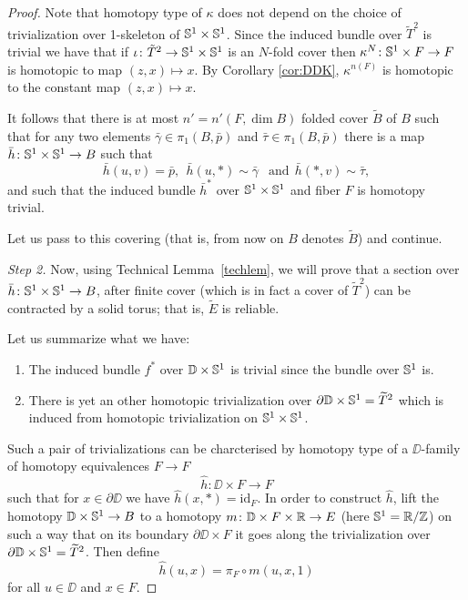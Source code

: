 \documentclass{amsart}
\begin{document}
\begin{proof}
Note that homotopy type of $\kappa$ does not depend on the choice of 
trivialization over 1-skeleton of ${\Bbb S}^1\times {\Bbb S}^1$.
Since the induced bundle over $\tilde T^2$ is trivial we have that 
if $ \iota\colon  \tilde T^2\to {\Bbb S}^1\times {\Bbb S}^1$ is an $N$-fold cover then 
$\kappa^N\colon {\Bbb S}^1\times F\to F$ is homotopic to map $(z,x)\mapsto x$.
By Corollary \ref{cor:DDK},  $\kappa^{n(F)}$ 
is homotopic to the constant map $(z,x)\mapsto x$.

It follows that there is  at most $n'=n'(F,\dim B)$ folded  cover $\widetilde B$ of $B$ such that for any two elements $\bar\gamma\in \pi_1(B,\bar p)$ and $\bar\tau\in \pi_1(B,\bar p)$ there is a map 
$\bar h\colon {\Bbb S}^1\times {\Bbb S}^1\to B$ such that 
$$\bar h(u,v)=\bar p,\ \ 
\bar h(u,*)\sim\bar\gamma\ \ \text{ and}\ \ 
\bar h(*,v)\sim\bar\tau,$$
and such that the induced bundle $\bar h^*$ over ${\Bbb S}^1\times {\Bbb S}^1$ and fiber $F$ is homotopy trivial.

\medskip

Let us pass to this covering (that is, from now on $B$ denotes $\widetilde B$) and continue.

\medskip

\noindent\textit{Step 2.} 
Now, using Technical Lemma~\ref{techlem}, 
we will prove that a section over 
$\bar h\colon {\Bbb S}^1\times {\Bbb S}^1\to B$, after finite cover (which is in fact a cover of $\tilde T^2$) can be contracted by a solid torus;
that is, $\widetilde E$ is reliable. 

Let us summarize what we have:

\begin{enumerate}
\item The  induced bundle $f^*$ over $\mathbb{D}\times {\Bbb S}^1$ is trivial since the bundle over ${\Bbb S}^1$ is. 
\item There is yet an other homotopic trivialization over $\partial \mathbb{D}\times {\Bbb S}^1=\widetilde T^2$ which is induced from homotopic trivialization on ${\Bbb S}^1\times {\Bbb S}^1$.
\end{enumerate}



Such a pair of trivializations can be charcterised by homotopy type of a
$\DD$-family of homotopy equivalences $F\to F$
\[\hat h\colon \DD\times F\to F\]
such that for 
$x\in\partial \DD$ we have $\hat h(x,*)=\mathrm{id}_F$.
In order to construct $\hat h$, 
lift the homotopy $\mathbb{D}\times {\Bbb S}^1\to B$ to a homotopy 
$m\colon \mathbb{D}\times F\times {\Bbb R}\to E$ 
(here ${\Bbb S}^1={\Bbb R}/{\Bbb Z}$) on such a way that on its boundary $\partial \DD\times F$ it goes along the trivialization over $\partial \mathbb{D}\times {\Bbb S}^1=\widetilde T^2$.
Then define 
\[\hat h(u,x)=\pi_F\circ m(u,x,1)\] 
for all $u\in \DD$ and $x\in F$.


\end{proof}
\end{document}
